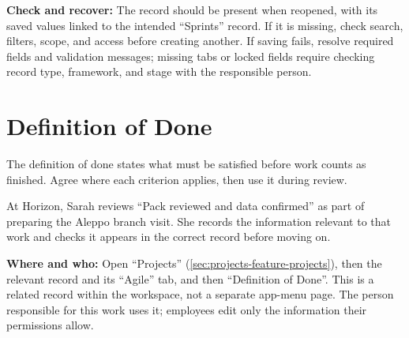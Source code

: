 \textbf{Check and recover:} The record should be present when reopened, with its saved values linked to the intended “Sprints” record. If it is missing, check search, filters, scope, and access before creating another. If saving fails, resolve required fields and validation messages; missing tabs or locked fields require checking record type, framework, and stage with the responsible person.

\clearpage
\section{Definition of Done}
\label{sec:projects-feature-definition-of-done}

The definition of done states what must be satisfied before work counts as finished. Agree where each criterion applies, then use it during review.

\begin{rcnote}
At Horizon, Sarah reviews “Pack reviewed and data confirmed” as part of preparing the Aleppo branch visit. She records the information relevant to that work and checks it appears in the correct record before moving on.
\end{rcnote}

\textbf{Where and who:} Open “Projects” (\ref{sec:projects-feature-projects}), then the relevant record and its “Agile” tab, and then “Definition of Done”. This is a related record within the workspace, not a separate app-menu page. The person responsible for this work uses it; employees edit only the information their permissions allow.


